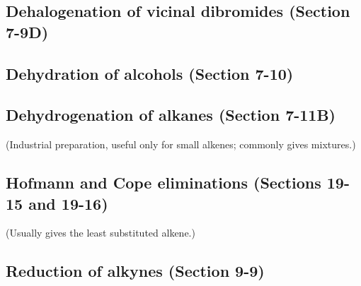 

\subsection{Dehalogenation of vicinal dibromides \normalfont(Section 7-9D)}



\subsection{Dehydration of alcohols \normalfont(Section 7-10)}



\subsection{Dehydrogenation of alkanes \normalfont(Section 7-11B)}

(Industrial preparation, useful only for small alkenes; commonly gives mixtures.)


\subsection{Hofmann and Cope eliminations \normalfont(Sections 19-15 and 19-16)}

(Usually gives the least substituted alkene.)


\subsection{Reduction of alkynes \normalfont(Section 9-9)}

